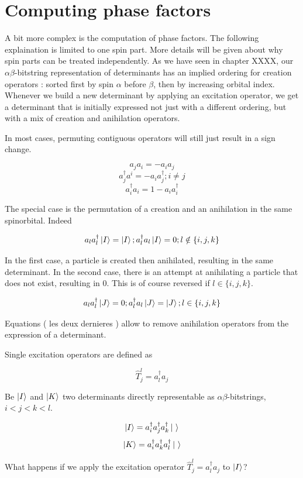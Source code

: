 \section{Computing phase factors}



A bit more complex is the computation of phase factors. The following explaination is limited to one spin part. More details will be given about why spin parts can be treated independently.
As we have seen in chapter XXXX, our $\alpha \beta$-bitstring representation of determinants has an implied ordering for creation operators : sorted first by spin $\alpha$ before $\beta$, then by increasing orbital index.
Whenever we build a new determinant by applying an excitation operator, we get a determinant that is initially expressed not just with a different ordering, but with a mix of creation and anihilation operators.

In most cases, permuting contiguous operators will still just result in a sign change.

$$a_j a_i = -a_i a_j$$
$$a^\dagger_j a^i = -a_i a^\dagger_j ; i \neq j$$
$$a^\dagger_i a_i = 1-a_i a^\dagger_i$$

The special case is the permutation of a creation and an anihilation in the same spinorbital. Indeed

$$a_l a^\dagger_l \ket I  = \ket I ; a^\dagger_l a_l \ket I = 0 ; l \notin \{i,j,k\}$$

In the first case, a particle is created then anihilated, resulting in the same determinant. In the second case, there is an attempt at anihilating a particle that does not exist, resulting in $0$. This is of course reversed if $l \in \{i,j,k\}$.

$$a_l a^\dagger_l \ket J  = 0 ; a^\dagger_l a_l \ket J  = \ket J; l \in \{i,j,k\}$$


Equations ( les deux dernieres ) allow to remove anihilation operators from the expression of a determinant.



Single excitation operators are defined as

$$\hat T_j^l=a^\dagger_l a_j$$

Be $\ket I$ and $\ket K$ two determinants directly representable as $\alpha \beta$-bitstrings, $i<j<k<l$.

$$\ket I = a^\dagger_i a^\dagger_j a^\dagger_k \ket \ $$
$$\ket K = a^\dagger_i a^\dagger_k a^\dagger_l \ket \  $$


What happens if we apply the excitation operator $\hat T_j^l=a^\dagger_l a_j$ to $\ket I$?


